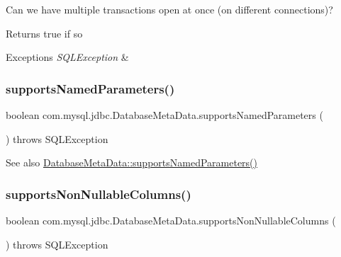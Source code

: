 Can we have multiple transactions open at once (on different connections)?

\begin{DoxyReturn}{Returns}
true if so 
\end{DoxyReturn}

\begin{DoxyExceptions}{Exceptions}
{\em S\+Q\+L\+Exception} & \\
\hline
\end{DoxyExceptions}
\mbox{\label{classcom_1_1mysql_1_1jdbc_1_1_database_meta_data_af500399c9ce848e48bd0d8f43a3a6966}} 
\subsubsection{\texorpdfstring{supports\+Named\+Parameters()}{supportsNamedParameters()}}
{\footnotesize\ttfamily boolean com.\+mysql.\+jdbc.\+Database\+Meta\+Data.\+supports\+Named\+Parameters (\begin{DoxyParamCaption}{ }\end{DoxyParamCaption}) throws S\+Q\+L\+Exception}

\begin{DoxySeeAlso}{See also}
\mbox{\hyperlink{classcom_1_1mysql_1_1jdbc_1_1_database_meta_data_af500399c9ce848e48bd0d8f43a3a6966}{Database\+Meta\+Data\+::supports\+Named\+Parameters()}} 
\end{DoxySeeAlso}
\mbox{\label{classcom_1_1mysql_1_1jdbc_1_1_database_meta_data_adffd73673ebc4cf69163b0c4316bad08}} 
\subsubsection{\texorpdfstring{supports\+Non\+Nullable\+Columns()}{supportsNonNullableColumns()}}
{\footnotesize\ttfamily boolean com.\+mysql.\+jdbc.\+Database\+Meta\+Data.\+supports\+Non\+Nullable\+Columns (\begin{DoxyParamCaption}{ }\end{DoxyParamCaption}) throws S\+Q\+L\+Exception}

